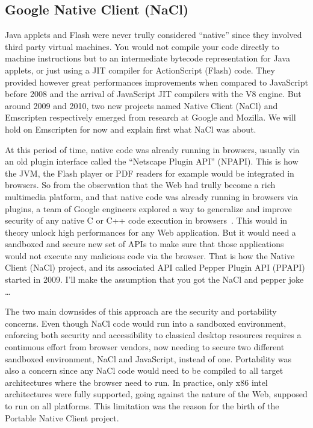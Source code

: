 \subsection{Google Native Client (NaCl)}%
\label{sub:nacl}

Java applets and Flash were never trully considered ``native''
since they involved third party virtual machines.
You would not compile your code directly to machine instructions
but to an intermediate bytecode representation for Java applets,
or just using a JIT compiler for ActionScript (Flash) code.
They provided however great performances improvements when compared
to JavaScript before 2008 and the arrival of JavaScript JIT compilers with the V8 engine.
But around 2009 and 2010, two new projects named Native Client (NaCl) and Emscripten
respectively emerged from research at Google and Mozilla.
We will hold on Emscripten for now and explain first what NaCl was about.

At this period of time, native code was already running in browsers,
usually via an old plugin interface called the ``Netscape Plugin API'' (NPAPI).
This is how the JVM, the Flash player or PDF readers for example
would be integrated in browsers.
So from the observation that the Web had trully become a rich multimedia platform,
and that native code was already running in browsers via plugins,
a team of Google engineers explored a way to generalize and improve security
of any native C or C++ code execution in browsers~\cite{yee2009native}.
This would in theory unlock high performances for any Web application.
But it would need a sandboxed and secure new set of APIs
to make sure that those applications would not execute any malicious code via the browser.
That is how the Native Client (NaCl) project,
and its associated API called Pepper Plugin API (PPAPI) started in 2009.
I'll make the assumption that you got the NaCl and pepper joke \ldots

The two main downsides of this approach are the security and portability concerns.
Even though NaCl code would run into a sandboxed environment,
enforcing both security and accessibility to classical desktop resources
requires a continuous effort from browser vendors,
now needing to secure two different sandboxed environment,
NaCl and JavaScript, instead of one.
Portability was also a concern since any NaCl code would need to be compiled
to all target architectures where the browser need to run.
In practice, only x86 intel architectures were fully supported,
going against the nature of the Web, supposed to run on all platforms.
This limitation was the reason for the birth of the Portable Native Client project.

